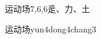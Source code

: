 \begin{entry}{运动场}{7,6,6}{⾡、⼒、⼟}
  \begin{phonetics}{运动场}{yun4dong4chang3}
  \end{phonetics}
\end{entry}
